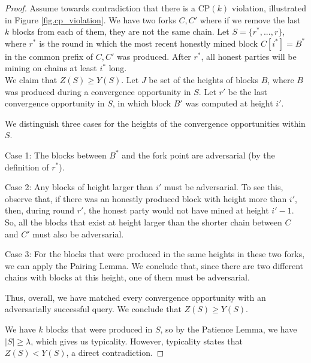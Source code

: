 \begin{proof}
Assume towards contradiction that there is a CP$(k)$ violation, illustrated in Figure \ref{fig.cp_violation}.
We have two forks $C, C'$ where if we remove the last $k$ blocks from each of them, they are not the same chain. Let $S = \{ r^*, ..., r\}$, where $r^*$ is the round in which the most recent honestly mined block $C[i^*] = B^*$ in the common prefix of $C, C'$ was produced. After $r^*$, all honest parties will be mining on chains at least $i^*$ long. \\

We claim that $Z(S) \geq Y(S)$. Let $J$ be set of the heights of blocks $B$, where $B$ was produced during a convergence opportunity in $S$. Let $r'$ be the last convergence opportunity in $S$, in which block $B'$ was computed at height $i'$.

We distinguish three cases for the heights of the convergence opportunities within $S$.

Case 1: The blocks between $B^*$ and the fork point are adversarial (by the definition of $r^*$).

Case 2: Any blocks of height larger than $i'$ must be adversarial. To see this, observe that, if there was an honestly produced block with height more than $i'$, then, during round $r'$, the honest party would not have mined at height $i' - 1$. So, all the blocks that exist at height larger than the shorter chain between $C$ and $C'$ must also be adversarial.

Case 3: For the blocks that were produced in the same heights in these two forks, we can apply the Pairing Lemma. We conclude that, since there are two different chains with blocks at this height, one of them must be adversarial.

Thus, overall, we have matched every convergence opportunity with an adversarially successful query. We conclude that $Z(S) \geq Y(S)$.

We have $k$ blocks that were produced in $S$, so by the Patience Lemma, we have $|S| \geq \lambda$, which gives us typicality. However, typicality states that $Z(S) < Y(S)$, a direct contradiction.
\end{proof}

